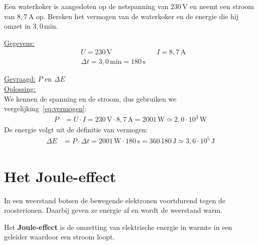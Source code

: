 \documentclass{ximera}
\begin{document}
\begin{example}[foldable=true,title={Voorbeeld: vermogen van een waterkoker}]\nl
    Een waterkoker is aangesloten op de netspanning van $230\,\mathrm{V}$ en neemt een stroom van $8{,}7\,\mathrm{A}$ op. Bereken het vermogen van de waterkoker en de energie die hij omzet in $3{,}0\,\mathrm{min}$.

    \begin{solution}\nl
        \underline{Gegevens:}
        \begin{align*}
            & U = 230\,\mathrm{V} & & I = 8{,}7\,\mathrm{A} \\
            & \Delta t = 3{,}0\,\mathrm{min} = 180\,\mathrm{s} & &
        \end{align*}

        \underline{Gevraagd:} $P$ en $\Delta E$ \\

        \underline{Oplossing:}\\
        We kennen de spanning en de stroom, dus gebruiken we vergelijking~\ref{eq:vermogen}:
        \begin{align*}
            P &= U \cdot I = 230\,\mathrm{V} \cdot 8{,}7\,\mathrm{A} = 2001\,\mathrm{W} \simeq \boxed{2{,}0 \cdot 10^{3}\,\mathrm{W}}
        \end{align*}
        De energie volgt uit de definitie van vermogen:
        \begin{align*}
            \Delta E &= P \cdot \Delta t = 2001\,\mathrm{W} \cdot 180\,\mathrm{s} = 360\,180\,\mathrm{J} \simeq \boxed{3{,}6 \cdot 10^{5}\,\mathrm{J}}
        \end{align*}
    \end{solution}
\end{example}

\section{Het Joule-effect}\label{sec:joule}
In een weerstand botsen de bewegende elektronen voortdurend tegen de roosterionen. Daarbij geven ze energie af en wordt de weerstand warm.

\begin{definition}[foldable=true,title={Joule-effect}]\nl
    Het \textbf{Joule-effect} is de omzetting van elektrische energie in warmte in een geleider waardoor een stroom loopt.
\end{definition}
\end{document}
